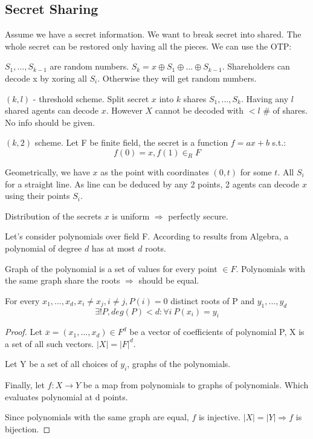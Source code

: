 \subsection{Secret Sharing}

Assume we have a secret information. We want to break secret into shared. The whole secret can be restored only having all the pieces.
We can use the OTP:

$S_1, ..., S_{k-1}$ are random numbers. $S_k = x \oplus S_1 \oplus ... \oplus S_{k-1}$.
Shareholders can decode x by xoring all $S_i$. Otherwise they will get random numbers.

\begin{definition}
	$(k, l)$ - threshold scheme. Split secret $x$ into $k$ shares $S_1, ..., S_k$.
	Having any $l$ shared agents can decode $x$. However $X$ cannot be decoded with $< l$ \# of shares. No info should be given.
\end{definition}

\begin{example}
	$(k, 2)$ scheme. Let F be finite field, the secret is a function $f = ax + b$ s.t.:
	\[ f(0) = x, f(1) \in_R F \]

	Geometrically, we have $x$ as the point with coordinates $(0, t)$ for some $t$.
	All $S_i$ for a straight line. As line can be deduced by any 2 points, 2 agents can decode $x$ using their points $S_i$.

	Distribution of the secrets $x$ is uniform $\Rightarrow$ perfectly secure.
\end{example}

Let's consider polynomials over field F.
According to results from Algebra, a polynomial of degree $d$ has at most $d$ roots.

Graph of the polynomial is a set of values for every point $\in F$.
Polynomials with the same graph share the roots $\Rightarrow$ should be equal.

\begin{theorem}
	For every $x_1, ..., x_d, x_i \neq x_j, i \ne j, P(i) = 0$ distinct roots of P and $y_1, ..., y_d$
	\[ \exists! P, deg(P) < d: \forall i\ P(x_i) = y_i \]
\end{theorem}
\begin{proof}
	Let $ \overline{x} = (x_1, ..., x_d) \in F^d$ be a vector of coefficients of polynomial P, X is a set of all such vectors. $|X| = |F|^d$.

	Let Y be a set of all choices of $y_i$, graphs of the polynomials.

	Finally, let $f:X \to Y$ be a map from polynomials to graphs of polynomials. Which evaluates polynomial at d points.

	Since polynomials with the same graph are equal, $f$ is injective. $|X| = |Y| \Rightarrow f$ is bijection.
\end{proof}


